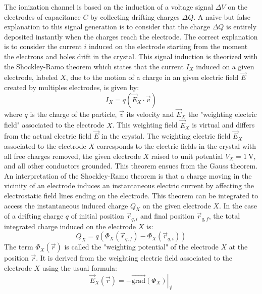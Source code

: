 The ionization channel is based on the induction of a voltage signal $\Delta V$ on the electrodes  of capacitance $C$ by collecting drifting charges $\Delta Q$. A naive but false explanation to this signal generation is to consider that the charge $\Delta Q$ is entirely deposited instantly when the charges reach the electrode. The correct explanation is to consider the current $i$ induced on the electrode starting from the moment the electrons and holes drift in the crystal. This signal induction is theorized with the Shockley-Ramo theorem \cite{Shockley:1938itm} \cite{Ramo:1939vr} which states that the current $I_X$ induced on a given electrode, labeled $X$, due to the motion of a charge in an given electric field $\vec{E}$ created by multiples electrodes, is given by:
\begin{equation}
I_X = q \left( \vec{E}_X \cdot \vec{v} \right)
\end{equation}
where $q$ is the charge of the particle, $\vec{v}$ its velocity and $\vec{E}_X$ the "weighting electric field" associated to the electrode $X$. This weighting field $\vec{E}_X$ is virtual and differs from the actual electric field $\vec{E}$ in the crystal. The weighting electric field $\vec{E}_X$ associated to the electrode $X$ corresponds to the electric fields in the crystal with all free charges removed, the given electrode $X$ raised to unit potential $V_X = \SI{1}{\volt}$, and all other conductors grounded. This theorem ensues from the Gauss theorem.
An interpretation of the Shockley-Ramo theorem is that a charge moving in the vicinity of an electrode induces an instantaneous electric current by affecting the electrostatic field lines ending on the electrode.
This theorem can be integrated to access the instantaneous induced charge $Q_X$ on the given electrode $X$. In the case of a drifting charge $q$ of initial position $\vec{r}_{q,i}$ and final position $\vec{r}_{q,f}$, the total integrated charge induced on the electrode $X$ is:
\begin{equation}
Q_X = q \left( \Phi_X (\vec{r}_{q,f}) - \Phi_X (\vec{r}_{q,i}) \right)
\end{equation}
The term $\Phi_X(\vec{r})$ is called the "weighting potential" of the electrode $X$ at the position $\vec{r}$. It is derived from the weighting electric field associated to the electrode $X$ using the usual formula:
\begin{equation}
\vec{E}_X (\vec{r}) = - \left. \overrightarrow{\mathrm{grad}} \left(  \Phi_X \right)  \right|_{\vec{r}}
\end{equation}

